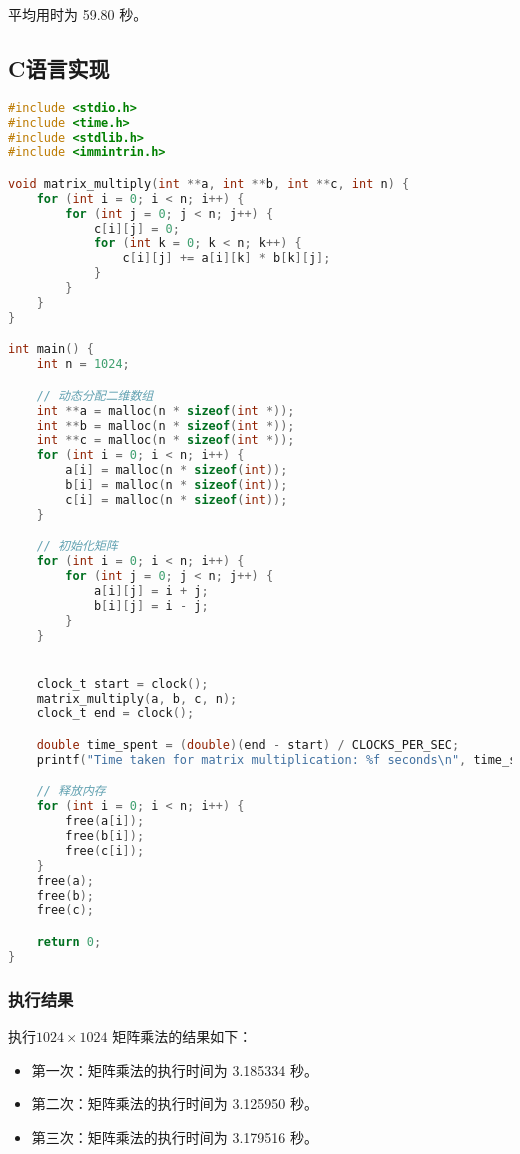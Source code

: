 \documentclass[a4paper,12pt]{ctexart}
\begin{document}
平均用时为 59.80 秒。

\subsection{C语言实现}
\begin{lstlisting}[language=C, caption={矩阵乘法C语言源码}]
#include <stdio.h>
#include <time.h>
#include <stdlib.h>
#include <immintrin.h>

void matrix_multiply(int **a, int **b, int **c, int n) {
    for (int i = 0; i < n; i++) {
        for (int j = 0; j < n; j++) {
            c[i][j] = 0;
            for (int k = 0; k < n; k++) {
                c[i][j] += a[i][k] * b[k][j];
            }
        }
    }
}

int main() {
    int n = 1024;

    // 动态分配二维数组
    int **a = malloc(n * sizeof(int *));
    int **b = malloc(n * sizeof(int *));
    int **c = malloc(n * sizeof(int *));
    for (int i = 0; i < n; i++) {
        a[i] = malloc(n * sizeof(int));
        b[i] = malloc(n * sizeof(int));
        c[i] = malloc(n * sizeof(int));
    }

    // 初始化矩阵
    for (int i = 0; i < n; i++) {
        for (int j = 0; j < n; j++) {
            a[i][j] = i + j;
            b[i][j] = i - j;
        }
    }


    clock_t start = clock();
    matrix_multiply(a, b, c, n);
    clock_t end = clock();

    double time_spent = (double)(end - start) / CLOCKS_PER_SEC;
    printf("Time taken for matrix multiplication: %f seconds\n", time_spent);

    // 释放内存
    for (int i = 0; i < n; i++) {
        free(a[i]);
        free(b[i]);
        free(c[i]);
    }
    free(a);
    free(b);
    free(c);

    return 0;
}
\end{lstlisting}

\subsubsection{执行结果}
执行$1024 \times 1024$ 矩阵乘法的结果如下：
\begin{itemize}
    \item 第一次：矩阵乘法的执行时间为 3.185334 秒。
    \item 第二次：矩阵乘法的执行时间为 3.125950 秒。
    \item 第三次：矩阵乘法的执行时间为 3.179516 秒。
\end{itemize}
\end{document}
